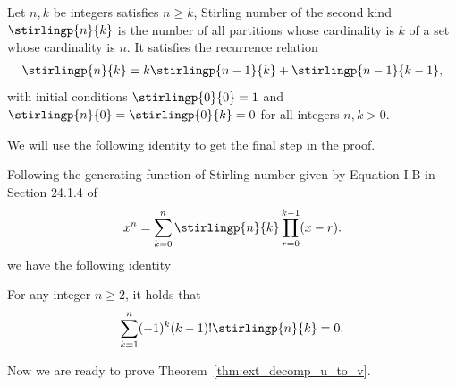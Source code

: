 \documentclass[letterpaper,11pt]{article}
\begin{document}
\begin{definition}
\label{def:stirling_number}
    Let $n,k$ be integers satisfies $n \geq k$, Stirling number of the second kind $\stirlingp{n}{k}$ is the number of all partitions whose cardinality is $k$ of a set whose cardinality is $n$. It satisfies the recurrence relation 
    \begin{align*}
        \stirlingp{n}{k} = k \stirlingp{n-1}{k} + \stirlingp{n-1}{k-1},
    \end{align*}
    with initial conditions $\stirlingp{0}{0} = 1$ and $\stirlingp{n}{0} = \stirlingp{0}{k} = 0$ for all integers $n, k > 0$.
\end{definition}

We will use the following identity to get the final step in the proof. 

Following the generating function of Stirling number given by Equation I.B in Section 24.1.4 of \cite{abramowitz1948handbook}
\begin{align*}
    x^n = \sum_{k=0}^{n} \stirlingp{n}{k} \prod_{r=0}^{k-1} (x-r).
\end{align*}
we have the following identity
\begin{lemma}
    \label{lem:stirling_identity}
    For any integer $n \geq 2$, it holds that
    \begin{align*}
        \sum_{k=1}^{n} (-1)^k (k-1)! \stirlingp{n}{k} = 0.
    \end{align*}
\end{lemma}

Now we are ready to prove Theorem~\ref{thm:ext_decomp_u_to_v}.
\end{document}
